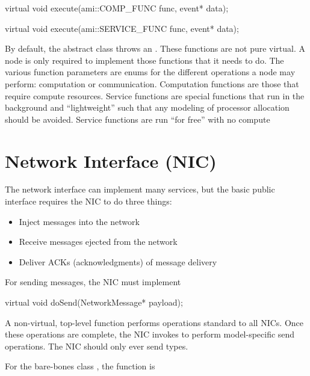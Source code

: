 \begin{CppCode}
virtual void execute(ami::COMP_FUNC func, event* data);

virtual void execute(ami::SERVICE_FUNC func, event* data);
\end{CppCode}	

By default, the abstract \nodecls class throws an . These functions are not pure virtual.
A node is only required to implement those functions that it needs to do.
The various function parameters are enums for the different operations a node may perform:
computation or communication. Computation functions are those that require compute resources. Service functions are special functions that run in the background and ``lightweight'' such that any modeling of processor allocation should be avoided. Service functions are run ``for free'' with no compute 

\section{Network Interface (NIC)}\label{sec:nic}
The network interface can implement many services, but the basic public interface requires the NIC to do three things:

\begin{itemize}
\item Inject messages into the network
\item Receive messages ejected from the network
\item Deliver ACKs (acknowledgments) of message delivery
\end{itemize}

For sending messages, the NIC must implement

\begin{CppCode}
  virtual void doSend(NetworkMessage* payload);
\end{CppCode}
A non-virtual, top-level  function performs operations standard to all NICs.
Once these operations are complete, the NIC invokes  to perform model-specific send operations.
The NIC should only ever send  types.

For the bare-bones class , the function is

